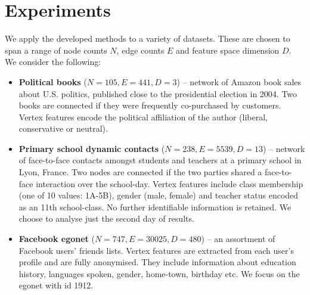 \section{Experiments}
\label{sec:experiments}

We apply the developed methods to a variety of datasets. These are chosen to span a range of node counts $N$, edge counts $E$ and feature space dimension $D$. We consider the following:

\begin{itemize}[leftmargin=*]
	\item \textbf{Political books} \cite{polbooks} ($N=105, E=441, D=3$) -- network of Amazon book sales about U.S. politics, published close to the presidential election in 2004. Two books are connected if they were frequently co-purchased by customers. Vertex features encode the political affiliation of the author (liberal, conservative or neutral).
		
	\item \textbf{Primary school dynamic contacts} \cite{schools} ($N=238, E=5539, D=13$) -- network of face-to-face contacts amongst students and teachers at a primary school in Lyon, France. Two nodes are connected if the two parties shared a face-to-face interaction over the school-day. Vertex features include class membership (one of 10 values: 1A-5B), gender (male, female) and teacher status encoded as an 11th school-class. No further identifiable information is retained. We choose to analyse just the second day of results.
	
	\item \textbf{Facebook egonet} \cite{fb-snap} ($N=747, E=30025, D=480$) -- an assortment of Facebook users' friends lists. Vertex features are extracted from each user's profile and are fully anonymised. They include information about education history, languages spoken, gender, home-town, birthday etc. We focus on the egonet with id 1912.

\end{itemize}

